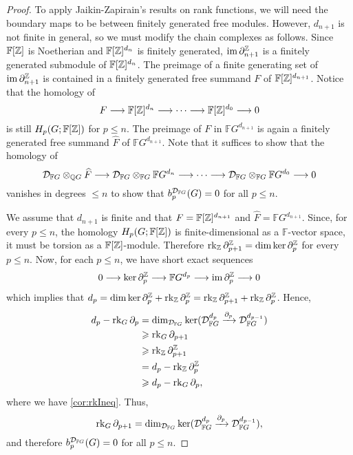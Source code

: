 \documentclass[11pt, letterpaper]{amsart}
\begin{document}
\begin{proof}
    To apply Jaikin-Zapirain's results on rank functions, we will need the boundary maps to be between finitely generated free modules. However, $d_{n+1}$ is not finite in general, so we must modify the chain complexes as follows. Since $\mathbb F[\mathbb{Z}]$ is Noetherian and $\mathbb F[\mathbb{Z}]^{d_n}$ is finitely generated, $\operatorname{im} \partial_{n+1}^{\mathbb{Z}}$ is a finitely generated submodule of $\mathbb F[\mathbb{Z}]^{d_n}$. The preimage of a finite generating set of $\operatorname{im} \partial_{n+1}^{\mathbb{Z}}$ is contained in a finitely generated free summand $F$ of $\mathbb F[\mathbb{Z}]^{d_{n+1}}$. Notice that the homology of 
    \[    
        F \longrightarrow \mathbb F[\mathbb{Z}]^{d_n} \longrightarrow \cdots \longrightarrow \mathbb F[\mathbb{Z}]^{d_0} \longrightarrow 0
    \]
    is still $H_p(G; \mathbb F[\mathbb{Z}])$ for $p \leqslant n$. The preimage of $F$ in $\mathbb F G^{d_{n+1}}$ is again a finitely generated free summand $\widehat{F}$ of $\mathbb F G^{d_{n+1}}$. Note that it suffices to show that the homology of
    \[
        \mathcal{D}_{\mathbb F{G}} \otimes_{\mathbb{Q} G} \widehat{F} \longrightarrow \mathcal{D}_{\mathbb F{G}} \otimes_{\mathbb F G} \mathbb F G^{d_n} \longrightarrow \cdots \longrightarrow \mathcal{D}_{\mathbb F{G}} \otimes_{\mathbb F G} \mathbb F G^{d_0} \longrightarrow 0
    \]
    vanishes in degrees $\leqslant n$ to show that $b_p^{\mathcal{D}_{\mathbb F{G}}}(G) = 0$ for all $p \leqslant n$.

    We assume that $d_{n+1}$ is finite and that $F = \mathbb F[\mathbb{Z}]^{d_{n+1}}$ and $\widehat{F} = \mathbb F G^{d_{n+1}}$. Since, for every $p \leqslant n$, the homology $H_p(G;\mathbb F[\mathbb{Z}])$ is finite-dimensional as a $\mathbb F$-vector space, it must be torsion as a $\mathbb F[\mathbb{Z}]$-module. Therefore $\operatorname{rk}_{\mathbb{Z}} \partial_{p+1}^{\mathbb{Z}} = \dim \ker \partial_p^{\mathbb{Z}}$ for every $p \leqslant n$. Now, for each $p \leqslant n$, we have short exact sequences
    \[
        0 \longrightarrow \ker \partial_p^{\mathbb{Z}} \longrightarrow \mathbb F G^{d_p} \longrightarrow \operatorname{im} \partial_p^{\mathbb{Z}} \longrightarrow 0
    \]
    which implies that $d_p = \dim \ker \partial_p^{\mathbb{Z}} + \operatorname{rk}_{\mathbb{Z}} \partial_p^{\mathbb{Z}} = \operatorname{rk}_{\mathbb{Z}} \partial_{p+1}^{\mathbb{Z}} + \operatorname{rk}_{\mathbb{Z}} \partial_p^{\mathbb{Z}}$. Hence,
    \begin{align*}
        d_p - \operatorname{rk}_G \partial_p &= \dim_{\mathcal{D}_{\mathbb F{G}}} \ker(\mathcal{D}_{\mathbb F{G}}^{d_p} \xrightarrow{\partial_p} \mathcal{D}_{\mathbb F{G}}^{d_{p-1}} ) \\
        &\geqslant \operatorname{rk}_G \partial_{p+1} \\
        &\geqslant \operatorname{rk}_{\mathbb{Z}} \partial_{p+1}^{\mathbb{Z}} \\
        &= d_p - \operatorname{rk}_{\mathbb{Z}} \partial_p^{\mathbb{Z}} \\
        &\geqslant d_p - \operatorname{rk}_G \partial_p,
    \end{align*}
    where we have \cref{cor:rkIneq}. Thus, 
    \[
        \operatorname{rk}_G \partial_{p+1} = \dim_{\mathcal{D}_{\mathbb F{G}}} \ker(\mathcal{D}_{\mathbb F{G}}^{d_p} \xrightarrow{\partial_p} \mathcal{D}_{\mathbb F{G}}^{d_{p-1}} ),
    \]
    and therefore $b_p^{\mathcal{D}_{\mathbb F{G}}}(G) = 0$ for all $p \leqslant n$. \qedhere
\end{proof}
\end{document}
